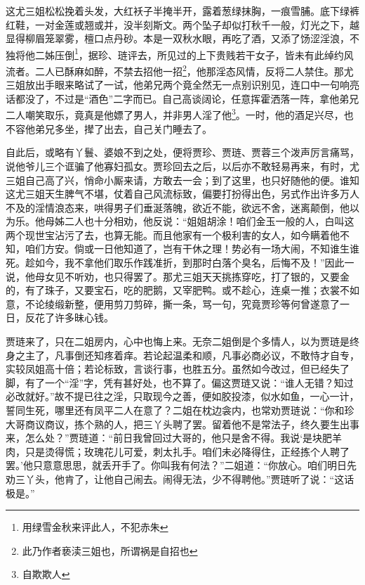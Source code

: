 \documentclass[12pt,oneside]{book}
\begin{document}
这尤三姐松松挽着头发，大红袄子半掩半开，露着葱绿抹胸，一痕雪脯。底下绿裤红鞋，一对金莲或翘或并，没半刻斯文。两个坠子却似打秋千一般，灯光之下，越显得柳眉笼翠雾，檀口点丹砂。本是一双秋水眼，再吃了酒，又添了饧涩淫浪，不独将他二姊压倒\footnote{用绿雪金秋来评此人，不犯赤朱}，据珍、琏评去，所见过的上下贵贱若干女子，皆未有此绰约风流者。二人已酥麻如醉，不禁去招他一招\footnote{此乃作者亵渎三姐也，所谓祸是自招也}，他那淫态风情，反将二人禁住。那尤三姐放出手眼来略试了一试，他弟兄两个竟全然无一点别识别见，连口中一句响亮话都没了，不过是“酒色”二字而已。自己高谈阔论，任意挥霍洒落一阵，拿他弟兄二人嘲笑取乐，竟真是他嫖了男人，并非男人淫了他\footnote{自欺欺人}。一时，他的酒足兴尽，也不容他弟兄多坐，撵了出去，自己关门睡去了。

自此后，或略有丫鬟、婆娘不到之处，便将贾珍、贾琏、贾蓉三个泼声厉言痛骂，说他爷儿三个诓骗了他寡妇孤女。贾珍回去之后，以后亦不敢轻易再来，有时，尤三姐自己高了兴，悄命小厮来请，方敢去一会；到了这里，也只好随他的便。谁知这尤三姐天生脾气不堪，仗着自己风流标致，偏要打扮得出色，另式作出许多万人不及的淫情浪态来，哄得男子们垂涎落魄，欲近不能，欲远不舍，迷离颠倒，他以为乐。他母姊二人也十分相劝，他反说：“姐姐胡涂！咱们金玉一般的人，白叫这两个现世宝沾污了去，也算无能。而且他家有一个极利害的女人，如今瞒着他不知，咱们方安。倘或一日他知道了，岂有干休之理！势必有一场大闹，不知谁生谁死。趁如今，我不拿他们取乐作践准折，到那时白落个臭名，后悔不及！”因此一说，他母女见不听劝，也只得罢了。那尤三姐天天挑拣穿吃，打了银的，又要金的，有了珠子，又要宝石，吃的肥鹅，又宰肥鸭。或不趁心，连桌一推；衣裳不如意，不论绫缎新整，便用剪刀剪碎，撕一条，骂一句，究竟贾珍等何曾遂意了一日，反花了许多昧心钱。

贾琏来了，只在二姐房内，心中也悔上来。无奈二姐倒是个多情人，以为贾琏是终身之主了，凡事倒还知疼着痒。若论起温柔和顺，凡事必商必议，不敢恃才自专，实较凤姐高十倍；若论标致，言谈行事，也胜五分。虽然如今改过，但已经失了脚，有了一个“淫”字，凭有甚好处，也不算了。偏这贾琏又说：“谁人无错？知过必改就好。”故不提已往之淫，只取现今之善，便如胶投漆，似水如鱼，一心一计，誓同生死，哪里还有凤平二人在意了？二姐在枕边衾内，也常劝贾琏说：“你和珍大哥商议商议，拣个熟的人，把三丫头聘了罢。留着他不是常法子，终久要生出事来，怎么处？”贾琏道：“前日我曾回过大哥的，他只是舍不得。我说‘是块肥羊肉，只是烫得慌；玫瑰花儿可爱，刺太扎手。咱们未必降得住，正经拣个人聘了罢。’他只意意思思，就丢开手了。你叫我有何法？”二姐道：“你放心。咱们明日先劝三丫头，他肯了，让他自己闹去。闹得无法，少不得聘他。”贾琏听了说：“这话极是。”
\end{document}
